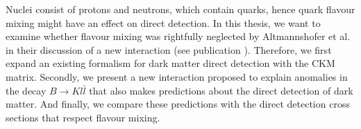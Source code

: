 

Nuclei consist of protons and neutrons, which contain quarks, hence quark flavour mixing might have an effect on direct detection. In this thesis, we want to examine whether flavour mixing was rightfully neglected by Altmannshofer et al. in their discussion of a new interaction (see publication \cite{Z}). Therefore, we first expand an existing formalism for dark matter direct detection with the CKM matrix. Secondly, we present a new interaction proposed to explain anomalies in the decay $B\rightarrow Kl\bar{l}$ that also makes predictions about the direct detection of dark matter. And finally, we compare these predictions with the direct detection cross sections that respect flavour mixing.


%	
